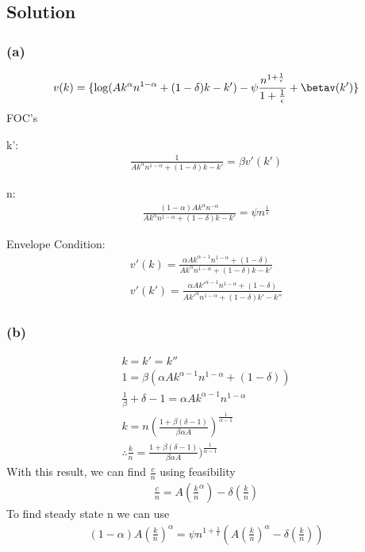 \documentclass[10pt, a4paper]{article}
\begin{document}
  \subsection*{Solution}
  \subsubsection*{(a)}
    \begin{gather*}
      v(k) = \{\log(Ak^{\alpha}n^{1-\alpha}+(1-\delta)k-k')-\psi\frac{n^{1+\frac{1}{\epsilon}}}{1+\frac{1}{\epsilon}}+\betav(k')\}
    \end{gather*}
    FOC's
    
    k':
    \begin{gather*}
      \frac{1}{Ak^{\alpha}n^{1-\alpha}+(1-\delta)k-k'} = \beta v'(k')
    \end{gather*}
    
    n:
    \begin{gather*}
      \frac{(1-\alpha)Ak^{\alpha}n^{-\alpha}}{Ak^{\alpha}n^{1-\alpha}+(1-\delta)k-k'} = \psi n^{\frac{1}{\epsilon}}
    \end{gather*}

    Envelope Condition:
    \begin{gather*}
      v'(k) = \frac{\alpha Ak^{\alpha-1}n^{1-\alpha}+(1-\delta)}{Ak^{\alpha}n^{1-\alpha}+(1-\delta)k-k'}\\
      v'(k') = \frac{\alpha Ak'^{\alpha-1}n^{1-\alpha}+(1-\delta)}{Ak'^{\alpha}n^{1-\alpha}+(1-\delta)k'-k''}
    \end{gather*}
    
  \subsubsection*{(b)}
    \begin{gather*}
      k=k'=k''\\
      1 = \beta(\alpha Ak^{\alpha-1}n^{1-\alpha}+(1-\delta))\\
      \frac{1}{\beta} +\delta - 1 = \alpha Ak^{\alpha-1}n^{1-\alpha}\\
      \boxed{k = n(\frac{1 + \beta(\delta-1)}{\beta\alpha A})^{\frac{1}{\alpha-1}}} \\
      \boxed{\therefore\frac{k}{n}=\frac{1 + \beta(\delta-1)}{\beta\alpha A})^{\frac{1}{\alpha-1}}}
    \end{gather*}
    With this result, we can find $\frac{c}{n}$ using feasibility 
    \begin{gather*}
      \boxed{\frac{c}{n} = A(\frac{k}{n}^{\alpha})-\delta(\frac{k}{n})}
    \end{gather*}
    To find steady state n we can use
    \begin{gather*}
      (1-\alpha)A(\frac{k}{n})^{\alpha}=\psi n^{1+\frac{1}{\epsilon}}(A(\frac{k}{n})^{\alpha}-\delta(\frac{k}{n}))
    \end{gather*}
\end{document}
